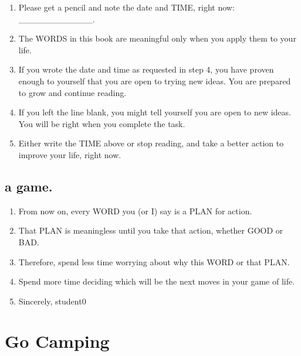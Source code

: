 \documentclass[
]{book}
\providecommand{\tightlist}{%
  \setlength{\itemsep}{0pt}\setlength{\parskip}{0pt}}
\begin{document}
\begin{enumerate}
\def\labelenumi{\arabic{enumi}.}
\setcounter{enumi}{3}
\tightlist
\item
  Please get a pencil and note the date and TIME, right now: \_\_\_\_\_\_\_\_\_\_\_\_.
\item
  The WORDS in this book are meaningful only when you apply them to your life.
\item
  If you wrote the date and time as requested in step 4, you have proven enough to yourself that you are open to trying
  new ideas. You are prepared to grow and continue reading.
\item
  If you left the line blank, you might tell yourself you are open to new ideas. You
  will be right when you complete the task.
\item
  Either write the TIME above or stop reading, and take a better action to improve
  your life, right now.
\end{enumerate}

\hypertarget{a-game.}{%
\subsection{a game.}\label{a-game.}}

\begin{enumerate}
\def\labelenumi{\arabic{enumi}.}
\setcounter{enumi}{8}
\item
  From now on, every WORD you (or I) say is a PLAN for action.
\item
  That PLAN is meaningless until you take that action, whether GOOD or BAD.
\item
  Therefore, spend less time worrying about why this WORD or that PLAN.
\item
  Spend more time deciding which will be the next moves in your game of life.
\item
  Sincerely, student0
\end{enumerate}

\hypertarget{go-camping}{%
\section{Go Camping}\label{go-camping}}
\end{document}
